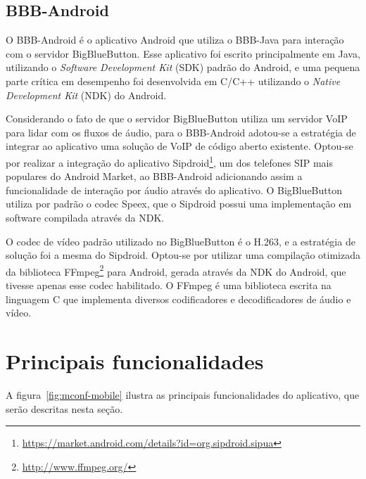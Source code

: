 \documentclass{acm_proc_article-sp}
\begin{document}
\subsection{BBB-Android}\label{subsec:bbb-android}

O BBB-Android é o aplicativo Android que utiliza o BBB-Java para interação com o servidor BigBlueButton. Esse aplicativo foi escrito principalmente em Java, utilizando o \emph{Software Development Kit} (SDK) padrão do Android, e uma pequena parte crítica em desempenho foi desenvolvida em C/C++ utilizando o \emph{Native Development Kit} (NDK) do Android.

Considerando o fato de que o servidor BigBlueButton utiliza um servidor VoIP para lidar com os fluxos de áudio, para o BBB-Android adotou-se a estratégia de integrar ao aplicativo uma solução de VoIP de código aberto existente. Optou-se por realizar a integração do aplicativo Sipdroid\footnote{\url{https://market.android.com/details?id=org.sipdroid.sipua}}, um dos telefones SIP mais populares do Android Market, ao BBB-Android adicionando assim a funcionalidade de interação por áudio através do aplicativo. O BigBlueButton utiliza por padrão o codec Speex, que o Sipdroid possui uma implementação em software compilada através da NDK.

O codec de vídeo padrão utilizado no BigBlueButton é o H.263, e a estratégia de solução foi a mesma do Sipdroid. Optou-se por utilizar uma compilação otimizada da biblioteca FFmpeg\footnote{\url{http://www.ffmpeg.org/}} para Android, gerada através da NDK do Android, que tivesse apenas esse codec habilitado. O FFmpeg é uma biblioteca escrita na linguagem C que implementa diversos codificadores e decodificadores de áudio e vídeo.

\section{Principais funcionalidades}

A figura~\ref{fig:mconf-mobile} ilustra as principais funcionalidades do aplicativo, que serão descritas nesta seção.
\end{document}
